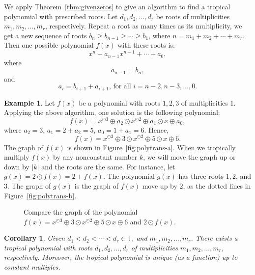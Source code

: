 \documentclass{amsart}
\newtheorem{cor}[thm]{Corollary}
\theoremstyle{definition}
\newtheorem{eg}{Example}[section]
\theoremstyle{remark}
\begin{document}
We apply Theorem~\ref{thm:givenzeros} to give an algorithm to find a tropical polynomial with prescribed roots. Let $d_1, d_2, \ldots, d_r$ be roots of multiplicities $m_1, m_2, \ldots, m_r$, respectively. Repeat a root as many times as its multiplicity, we get a new sequence of roots $b_n \geq b_{n-1} \geq \cdots \geq b_1$, where $n=m_1 + m_2 + \cdots + m_r$. Then one possible polynomial $f(x)$ with these roots is:
\[
x^n + a_{n-1} x^{n-1} + \cdots + a_0,
\]
where 
\[
a_{n-1} = b_{n},
\]
and
\[
a_i = b_{i+1} + a_{i+1} \mbox{, for all $i = n-2, n-3, \ldots, 0$}.
\]

\begin{eg}\label{eg:prezeros}
Let $f(x)$ be a polynomial with roots $1, 2, 3$ of multiplicities 1. Applying the above algorithm, one solution is the following polynomial:
\[
f(x) = x^{{\odot}3} {\oplus} a_2 {\odot} x^{{\odot} 2} {\oplus} a_1 {\odot} x {\oplus} a_0,
\]
where $a_2 = 3$, $a_1 = 2 + a_2 = 5$, $a_0 = 1 + a_1 = 6$. Hence, 
\[
f(x) = x^{{\odot}3} {\oplus} 3{\odot} x^{{\odot} 2} {\oplus} 5 {\odot} x {\oplus} 6.
\]
The graph of $f(x)$ is shown in Figure~\ref{fig:polytrans-a}. When we tropically multiply $f(x)$ by any nonconstant number $k$, we will move the graph up or down by $|k|$ and the roots are the same. For instance, let $g(x) = 2{\odot} f(x) = 2 + f(x)$. The polynomial $g(x)$ has three roots $1,2$, and $3$. The graph of $g(x)$ is the graph of $f(x)$ move up by $2$, as the dotted lines in Figure~\ref{fig:polytrans-b}.

\begin{figure}[h]
\begin{center}
\end{center}
\caption{Compare the graph of the polynomial $f(x) = x^{{\odot}3} {\oplus} 3{\odot} x^{{\odot} 2} {\oplus} 5 {\odot} x {\oplus} 6$ and $2 {\odot} f(x)$.}\label{fig:polytrans}
\end{figure}
\end{eg}

\begin{cor}
 Given $d_1 < d_2 < \cdots <d_r \in {\mathbb{T}}$, and $m_1, m_2, \ldots, m_r$. There exists a tropical polynomial with roots $d_1, d_2, \ldots, d_r$ of multiplicities $m_1, m_2, \ldots, m_r$, respectively. Moreover, the tropical polynomial is unique (as a function) up to constant multiples.
\end{cor}
\end{document}
